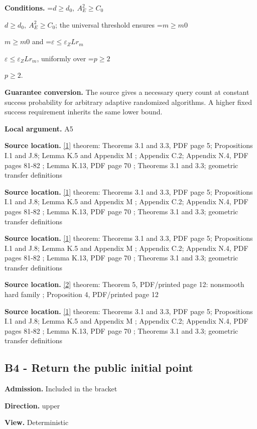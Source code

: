 \documentclass[10pt,a4paper]{article}
\newcommand{\AtlasMath}[1]{\par\begingroup\centering\setbox0=\hbox{$\displaystyle #1$}\ifdim\wd0>1.4\linewidth\typeout{ATLAS WIDE FORMULA: \the\wd0}\fi\ifdim\wd0>\linewidth\resizebox{\linewidth}{!}{\box0}\else\box0\fi\par\endgroup}
\newcommand{\AtlasInlineMath}[1]{\begingroup\setbox0=\hbox{$#1$}\ifdim\wd0>.4\linewidth\endgroup\AtlasMath{#1}\else\endgroup$#1$\fi}
\begin{document}
\textbf{Conditions.} \AtlasInlineMath{d\ge d_0,\ A_E^2\ge C_0}; the universal threshold ensures \AtlasInlineMath{m\ge m0} and \AtlasInlineMath{\varepsilon \le \varepsilon _Z Lr_m}, uniformly over \AtlasInlineMath{p\ge 2}.

\textbf{Guarantee conversion.} The source gives a necessary query count at constant success probability for arbitrary adaptive randomized algorithms. A higher fixed success requirement inherits the same lower bound.

\textbf{Local argument.} A5

\textbf{Source location.} \href{https://arxiv.org/html/2610.00345v1}{[1]} theorem: Theorems 3.1 and 3.3, PDF page 5; Propositions I.1 and J.8; Lemma K.5 and Appendix M ; Appendix C.2; Appendix N.4, PDF pages 81-82 ; Lemma K.13, PDF page 70 ; Theorems 3.1 and 3.3; geometric transfer definitions

\textbf{Source location.} \href{https://arxiv.org/html/2610.00345v1}{[1]} theorem: Theorems 3.1 and 3.3, PDF page 5; Propositions I.1 and J.8; Lemma K.5 and Appendix M ; Appendix C.2; Appendix N.4, PDF pages 81-82 ; Lemma K.13, PDF page 70 ; Theorems 3.1 and 3.3; geometric transfer definitions

\textbf{Source location.} \href{https://arxiv.org/html/2610.00345v1}{[1]} theorem: Theorems 3.1 and 3.3, PDF page 5; Propositions I.1 and J.8; Lemma K.5 and Appendix M ; Appendix C.2; Appendix N.4, PDF pages 81-82 ; Lemma K.13, PDF page 70 ; Theorems 3.1 and 3.3; geometric transfer definitions

\textbf{Source location.} \href{https://arxiv.org/html/2607.16558v2}{[2]} theorem: Theorem 5, PDF/printed page 12: nonsmooth hard family ; Proposition 4, PDF/printed page 12

\textbf{Source location.} \href{https://arxiv.org/html/2610.00345v1}{[1]} theorem: Theorems 3.1 and 3.3, PDF page 5; Propositions I.1 and J.8; Lemma K.5 and Appendix M ; Appendix C.2; Appendix N.4, PDF pages 81-82 ; Lemma K.13, PDF page 70 ; Theorems 3.1 and 3.3; geometric transfer definitions

\subsection{B4 - Return the public initial point}
\textbf{Admission.} Included in the bracket

\textbf{Direction.} upper

\textbf{View.} Deterministic
\end{document}
